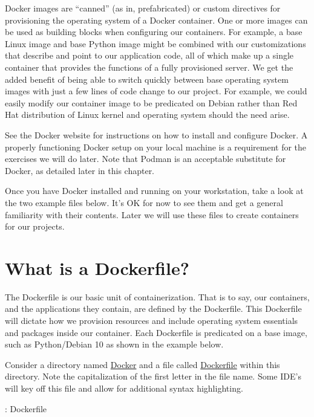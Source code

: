 \justify{}
Docker images are ``canned'' (as in, prefabricated) or custom directives
for provisioning the operating system of a Docker container. One or more
images can be used as building blocks when configuring our containers.
For example, a base Linux image and base Python image might be combined
with our customizations that describe and point to our application code,
all of which make up a single container that provides the functions of
a fully provisioned server. We get the added
benefit of being able to switch quickly between base operating system
images with just a few lines of code change to our project. For example,
we could easily modify our container image to be predicated on Debian
rather than Red Hat distribution of Linux kernel and operating system
should the need arise.

\justify{}
See the Docker website for instructions on how to install and configure
Docker. A properly functioning Docker setup on your local machine is a requirement
for the exercises we will do later. Note that Podman is an acceptable substitute
for Docker, as detailed later in this chapter.

\justify{}
Once you have Docker installed and running on your workstation, take a
look at the two example files below. It's OK for now to see them and get
a general familiarity with their contents. Later we will use these files
to create containers for our projects.

\section{What is a Dockerfile?}
\justify{}
The Dockerfile is our basic unit of containerization. That is to say,
our containers, and the applications they contain, are defined by the
Dockerfile. This Dockerfile will dictate how we provision resources and
include operating system essentials and packages inside our container.
Each Dockerfile is predicated on a base image, such as Python/Debian 10
as shown in the example below.

\justify{}
Consider a directory named
\href{https://github.com/hotpeppersec/rapid_secdev_framework/tree/master/docker}{Docker}
and a file called
\href{https://github.com/hotpeppersec/rapid_secdev_framework/blob/master/docker/Dockerfile}{Dockerfile}
within this directory. Note the capitalization of the first letter in the file name. Some IDE's will key off this file and allow for additional syntax highlighting.

\justify{}
\begin{mybox}{\thetcbcounter: Dockerfile}
  
\end{mybox}

